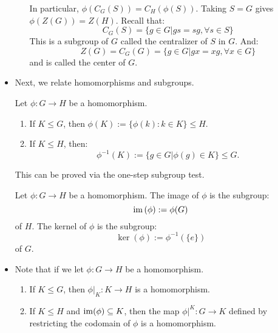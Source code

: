 \begin{itemize}
\begin{proposition}
\begin{enumerate}
            In particular, $\phi(C_G(S))=C_H(\phi(S))$. Taking $S=G$ gives $\phi(Z(G))=Z(H)$. Recall that:
            \begin{equation}
                C_G(S) = \{g\in G|gs=sg, \forall s \in S\}
            \end{equation}
            This is a subgroup of $G$ called the centralizer of $S$ in $G$. And:
            \begin{equation}
                Z(G) = C_G(G) = \{g\in G|gx=xg,\forall x\in G\}
            \end{equation}
            and is called the center of $G$.
        \end{enumerate}
    \end{proposition}
    \item Next, we relate homomorphisms and subgroups.
    \begin{proposition}
        Let $\phi:G\rightarrow H$ be a homomorphism.
        \begin{enumerate}
            \item If $K\le G$, then $\phi(K) := \{\phi(k):k \in K\} \le H$.
            \item If $K \le H$, then:
            \begin{equation}
                \phi^{-1}(K) := \{g\in G| \phi(g) \in K\} \le G.
            \end{equation}
        \end{enumerate}
    \end{proposition}
    This can be proved via the one-step subgroup test.
    \begin{definition}
        Let $\phi:G\rightarrow H$ be a homomorphism. The image of $\phi$ is the subgroup:
        \begin{equation}
            \mathrm{im}\,(\phi):= \phi(G)
        \end{equation}
        of $H$. The kernel of $\phi$ is the subgroup:
        \begin{equation}
            \ker(\phi):= \phi^{-1}(\{e\})
        \end{equation}
        of $G$.
    \end{definition}
    \item Note that if we let $\phi:G\rightarrow H$ be a homomorphism.
    \begin{enumerate}
        \item If $K \le G$, then $\phi|_K : K \rightarrow H$ is a homomorphism.
        \item If $K \le H$ and $\operatorname{im}(\phi) \subseteq K$, then the map $\phi|^K: G \rightarrow K$ defined by restricting the codomain of $\phi$ is a homomorphism.

\end{enumerate}
\end{itemize}
